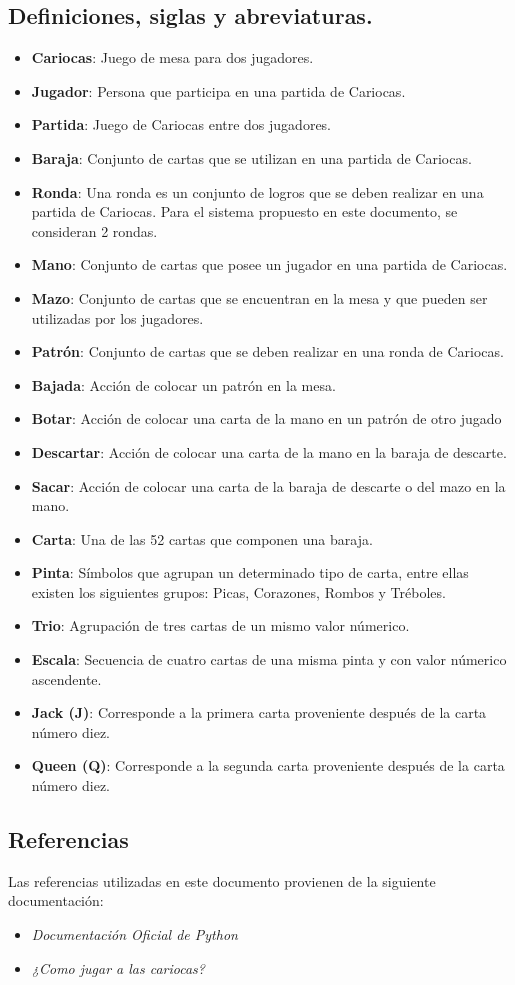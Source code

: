 \subsection{Definiciones, siglas y abreviaturas.}\label{cap:definiciones} 
\begin{itemize}
    \item \textbf{Cariocas}: Juego de mesa para dos jugadores.
    \item \textbf{Jugador}: Persona que participa en una partida de Cariocas.
    \item \textbf{Partida}: Juego de Cariocas entre dos jugadores.
    \item \textbf{Baraja}: Conjunto de cartas que se utilizan en una partida de Cariocas.
    \item \textbf{Ronda}: Una ronda es un conjunto de logros que se deben realizar en una partida de Cariocas. Para el sistema propuesto en este documento, se consideran 2 rondas.
    \item \textbf{Mano}: Conjunto de cartas que posee un jugador en una partida de Cariocas.
    \item \textbf{Mazo}: Conjunto de cartas que se encuentran en la mesa y que pueden ser utilizadas por los jugadores.
    \item \textbf{Patrón}: Conjunto de cartas que se deben realizar en una ronda de Cariocas.
    \item \textbf{Bajada}: Acción de colocar un patrón en la mesa.
    \item \textbf{Botar}: Acción de colocar una carta de la mano en un patrón de otro jugado
    \item \textbf{Descartar}: Acción de colocar una carta de la mano en la baraja de descarte.
    \item \textbf{Sacar}: Acción de colocar una carta de la baraja de descarte o del mazo en la mano.
    \item \textbf{Carta}: Una de las 52 cartas que componen una baraja.
    \item \textbf{Pinta}: Símbolos que agrupan un determinado tipo de carta, entre ellas existen los siguientes grupos: Picas, Corazones, Rombos y Tréboles.
    \item \textbf{Trio}: Agrupación de tres cartas de un mismo valor númerico.
    \item \textbf{Escala}: Secuencia de cuatro cartas de una misma pinta y con valor númerico ascendente.
    \item \textbf{Jack (J)}: Corresponde a la primera carta proveniente después de la carta número diez.
    \item \textbf{Queen (Q)}: Corresponde a la segunda carta proveniente después de la carta número diez.
\end{itemize} 

\subsection{Referencias}
Las referencias utilizadas en este documento provienen de la siguiente documentación:
\begin{itemize}
    \item \textit{Documentación Oficial de Python} \cite{python}
    \item \textit{¿Como jugar a las cariocas?} \cite{cariocas}
\end{itemize}